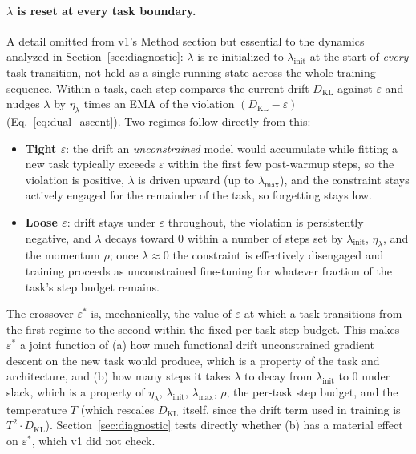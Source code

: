 \documentclass[11pt]{article}
\newcommand{\eps}{\varepsilon}
\newcommand{\epsstar}{\eps^{*}}
\newcommand{\DKL}{D_{\mathrm{KL}}}
\begin{document}
\paragraph{$\lambda$ is reset at every task boundary.} A detail omitted from
v1's Method section but essential to the dynamics analyzed in
Section~\ref{sec:diagnostic}: $\lambda$ is re-initialized to
$\lambda_{\mathrm{init}}$ at the start of \emph{every} task transition, not
held as a single running state across the whole training sequence. Within a
task, each step compares the current drift $\DKL$ against $\eps$ and nudges
$\lambda$ by $\eta_\lambda$ times an EMA of the violation
$(\DKL - \eps)$ (Eq.~\ref{eq:dual_ascent}). Two regimes follow directly from
this:
\begin{itemize}
  \item \textbf{Tight $\eps$}: the drift an \emph{unconstrained} model would
  accumulate while fitting a new task typically exceeds $\eps$ within the
  first few post-warmup steps, so the violation is positive, $\lambda$ is
  driven upward (up to $\lambda_{\max}$), and the constraint stays actively
  engaged for the remainder of the task, so forgetting stays low.
  \item \textbf{Loose $\eps$}: drift stays under $\eps$ throughout, the
  violation is persistently negative, and $\lambda$ decays toward 0 within a
  number of steps set by $\lambda_{\mathrm{init}}$, $\eta_\lambda$, and the
  momentum $\rho$; once $\lambda\approx 0$ the constraint is effectively
  disengaged and training proceeds as unconstrained fine-tuning for whatever
  fraction of the task's step budget remains.
\end{itemize}
The crossover $\epsstar$ is, mechanically, the value of $\eps$ at which a
task transitions from the first regime to the second within the fixed
per-task step budget. This makes $\epsstar$ a joint function of (a) how much
functional drift unconstrained gradient descent on the new task would
produce, which is a property of the task and architecture, and (b)
how many steps it takes $\lambda$ to decay from $\lambda_{\mathrm{init}}$ to
0 under slack, which is a property of $\eta_\lambda$, $\lambda_{\mathrm{init}}$,
$\lambda_{\max}$, $\rho$, the per-task step budget, and the temperature $T$
(which rescales $\DKL$ itself, since the drift term used in training is
$T^2\!\cdot\!\DKL$). Section~\ref{sec:diagnostic} tests directly whether (b)
has a material effect on $\epsstar$, which v1 did not check.
\end{document}

